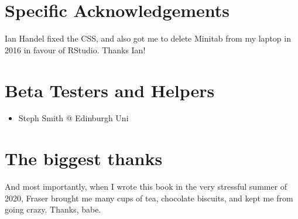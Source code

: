 \documentclass[
]{book}
\providecommand{\tightlist}{%
  \setlength{\itemsep}{0pt}\setlength{\parskip}{0pt}}
\begin{document}
\hypertarget{specific-acknowledgements}{%
\section{Specific Acknowledgements}\label{specific-acknowledgements}}

Ian Handel fixed the CSS, and also got me to delete Minitab from my laptop in 2016 in favour of RStudio. Thanks Ian!

\hypertarget{beta-testers-and-helpers}{%
\section{Beta Testers and Helpers}\label{beta-testers-and-helpers}}

\begin{itemize}
\tightlist
\item
  Steph Smith @ Edinburgh Uni
\end{itemize}

\hypertarget{the-biggest-thanks}{%
\section{The biggest thanks}\label{the-biggest-thanks}}

And most importantly, when I wrote this book in the very stressful summer of 2020, Fraser brought me many cups of tea, chocolate biscuits, and kept me from going crazy. Thanks, babe.
\end{document}
